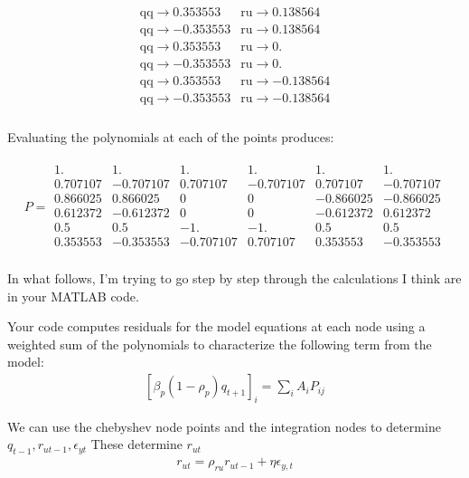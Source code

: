 \documentclass[12pt]{article}
\begin{document}
\begin{gather*}
   \begin{array}{cc}
                   \text{qq}\to 0.353553 & \text{ru}\to 0.138564 \\
                   \text{qq}\to -0.353553 & \text{ru}\to 0.138564 \\
                   \text{qq}\to 0.353553 & \text{ru}\to 0. \\
                   \text{qq}\to -0.353553 & \text{ru}\to 0. \\
                   \text{qq}\to 0.353553 & \text{ru}\to -0.138564 \\
                   \text{qq}\to -0.353553 & \text{ru}\to -0.138564 \\
                  \end{array}
\end{gather*}

Evaluating the polynomials at each of the points produces:

\begin{gather*}
P=     \begin{array}{cccccc}
    1. & 1. & 1. & 1. & 1. & 1. \\
    0.707107 & -0.707107 & 0.707107 & -0.707107 & 0.707107 & -0.707107 \\
    0.866025 & 0.866025 & 0 & 0 & -0.866025 & -0.866025 \\
    0.612372 & -0.612372 & 0 & 0 & -0.612372 & 0.612372 \\
    0.5 & 0.5 & -1. & -1. & 0.5 & 0.5 \\
    0.353553 & -0.353553 & -0.707107 & 0.707107 & 0.353553 & -0.353553 \\
   \end{array}
\end{gather*}

In what follows, I'm trying to go step by step through the calculations 
I think are in your MATLAB code. 

Your code computes residuals for the model equations at each node using a weighted sum of the polynomials to characterize the following term from the model:
\begin{gather*}
  \left [ \beta_p(1 - \rho_p)q_{t + 1}\right ]_i = \sum_{i} A_{i} P_{ij}
\end{gather*}

We can use the chebyshev node points and the integration nodes to determine
$q_{t-1},r_{ut-1},\epsilon_{yt}$
These determine $r_{ut}$
\begin{gather*}
 r_{ut} = \rho_{ru} r_{ut - 1} + \eta \epsilon_{y,t}
\end{gather*}
\end{document}
